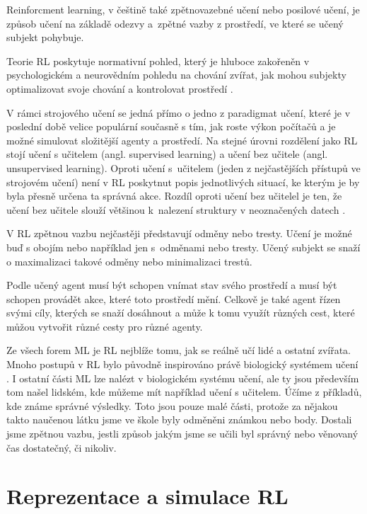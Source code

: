 \documentclass{article}
\begin{document}
Reinforcment learning, v češtině také zpětnovazebné učení nebo posilové učení, je způsob učení na základě odezvy a~zpětné vazby z prostředí, ve které se učený subjekt pohybuje. 

Teorie RL poskytuje normativní pohled, který je hluboce zakořeněn v psychologickém a neurovědním pohledu na chování zvířat, jak mohou subjekty optimalizovat svoje chování a kontrolovat prostředí \cite{mnih2015human}. 

V rámci strojového učení se jedná přímo o jedno z paradigmat učení, které je v poslední době velice populární současně s tím, jak roste výkon počítačů a je možné simulovat složitější agenty a prostředí. Na stejné úrovni rozdělení jako RL stojí učení s učitelem (angl. supervised learning) a učení bez učitele (angl. unsupervised learning). Oproti učení s~učitelem (jeden z nejčastějších přístupů ve strojovém učení) není v RL poskytnut popis jednotlivých situací, ke kterým je by byla přesně určena ta správná akce. Rozdíl oproti učení bez učitelel je ten, že učení bez učitele slouží většinou k~nalezení struktury v neoznačených datech \cite{sutton1998introduction}.

V RL zpětnou vazbu nejčastěji představují odměny nebo tresty. Učení je možné buď s obojím nebo například jen s~odměnami nebo tresty. Učený subjekt se snaží o maximalizaci takové odměny nebo minimalizaci trestů. 

Podle \cite{sutton1998introduction} učený agent musí být schopen vnímat stav svého prostředí a musí být schopen provádět akce, které toto prostředí mění. Celkově je také agent řízen svými cíly, kterých se snaží dosáhnout a může k tomu využít různých cest, které můžou vytvořit různé cesty pro různé agenty.

Ze všech forem ML je RL nejblíže tomu, jak se reálně učí lidé a ostatní zvířata. Mnoho postupů v RL bylo původně inspirováno právě biologický systémem učení \cite{sutton1998introduction}. I ostatní části ML lze nalézt v biologickém systému učení, ale ty jsou především tom našel lidském, kde můžeme mít například učení s učitelem. Účíme z příkladů, kde známe správné výsledky. Toto jsou pouze malé části, protože za nějakou takto naučenou látku jsme ve škole byly odměněni známkou nebo body. Dostali jsme zpětnou vazbu, jestli způsob jakým jsme se učili byl správný nebo věnovaný čas dostatečný, či nikoliv.

 
\section{Reprezentace a simulace RL}
\end{document}
